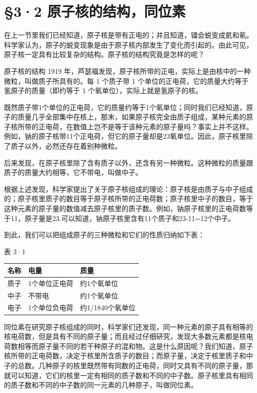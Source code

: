 \section{§3·2 原子核的结构，同位素}

在上一节里我们已经知道，原子核是带有正电的；并且知道，镭会蜕变成氦和氡。科学家认为，原子的蜕变现象是由于原子核内部发生了变化而引起的。由此可见，原子核一定具有比较复杂的结构。原子核的结构究竟是怎样的呢？

原子核的结构 1919
年，芦瑟福发现，原子核所带的正电，实际上是由核中的一种微粒，叫做质子所具有的。每
1 个质子带 1 个单位的正电荷，它的质量大约等于氢原子的质量（即约等于 1
个氧单位），实际上就是氢原子的核。

既然质子带1个单位的正电荷，它的质量约等于1个氧单位；同时我们已经知道，原子的质量几乎全部集中在核上，那末，如果原子核完全由质子组成，某种元素的原子核所带的正电荷，在数值上岂不是等于该种元素的原子量吗？事实上并不这样。例如，钠的原子核带11个正电荷，但它的原子量却是23氧单位。因此，原子核里除了质子以外，必然还存在着别种微粒。

后来发现，在原子核里除了含有质子以外，还含有另一种微粒。这种微粒的质量跟质子的质量大约相等，它不带电，叫做中子。

根据上述发现，科学家提出了关于原子核组成的理论：原子核是由质子与中子组成的；原子核里质子的数目等于原子核所带的正电荷数；原子核里中子的数目，等于这种元素的原子量的数值减去原子核里的质子数。例如，钠原子核里的正电荷数等于11，原子量是23.可以知道，钠原子核里含有11个质子和23-11=12个中子。

到此，我们可以把组成原子的三种微粒和它们的性质归纳如下表：

表 3·1

{\def\LTcaptype{none} %
\begin{longtable}[]{@{}lll@{}}
\toprule\noalign{}
名称 & 电量 & 质量 \\
\midrule\noalign{}
\endhead
\bottomrule\noalign{}
\endlastfoot
质子 & 1个单位正电荷 & 约1个氧单位 \\
中子 & 不带电 & 约1个氧单位 \\
电子 & 1个单位负电荷 & 约1/1840个氧单位 \\
\end{longtable}
}

同位素在研究原子核组成的同时，科学家们还发现，同一种元素的原子具有相等的核电荷数，但是具有不同的原子量；而且经过仔细研究，发现大多数元素都是核电荷数相等而原子量不同的若干种原子的混和物。这是什么原因呢？我们知道，原子核所带的正电荷数，决定于核里所含质子的数目；而原子量，决定于核里质子和中子的总数。几种原子的核里既然带有同数的正电荷，同时又具有不同的原子量，那就可以知道，它们的核里一定有相同的质子数和不同的中子数。原子核里具有相同的质子数和不同的中子数的同一元素的几种原子，叫做同位素。

